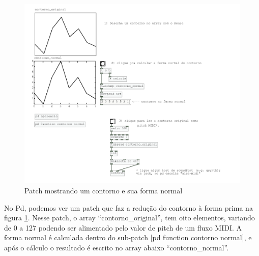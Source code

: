 \documentclass{ppgmus}
\begin{document}

\begin{figure}
\includegraphics[scale=.3]{contorno-normal}
\caption{Patch mostrando um contorno e sua forma normal}
\label{contorno-normal}
\end{figure}


No Pd, podemos ver um patch que faz a redução do contorno à forma prima 
na figura \ref{contorno-normal}. Nesse patch, o array ``contorno\_original'',
tem oito elementos, variando de 0 a 127 podendo ser alimentado pelo valor de pitch de um fluxo
MIDI. A forma normal é calculada dentro do sub-patch [pd function contorno normal], e após
o cálculo o resultado é escrito no array abaixo ``contorno\_normal''.
\end{document}
